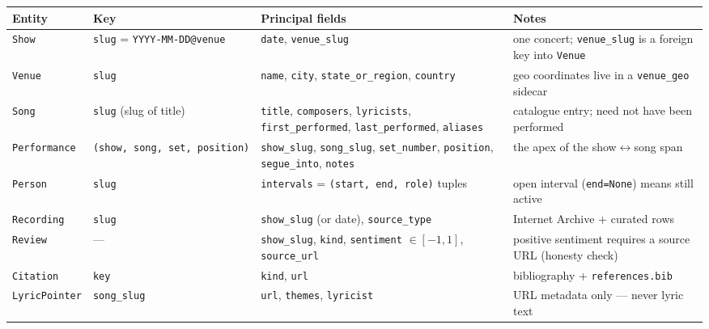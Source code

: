 \documentclass[
]{article}
\newcounter{none} %
\begin{document}
{\def\LTcaptype{none} %
\begin{longtable}[]{@{}
  >{\raggedright\arraybackslash}p{}
  >{\raggedright\arraybackslash}p{}
  >{\raggedright\arraybackslash}p{}
  >{\raggedright\arraybackslash}p{}@{}}
\toprule\noalign{}
\begin{minipage}[b]{\linewidth}\raggedright
Entity
\end{minipage} & \begin{minipage}[b]{\linewidth}\raggedright
Key
\end{minipage} & \begin{minipage}[b]{\linewidth}\raggedright
Principal fields
\end{minipage} & \begin{minipage}[b]{\linewidth}\raggedright
Notes
\end{minipage} \\
\midrule\noalign{}
\endhead
\bottomrule\noalign{}
\endlastfoot
\texttt{Show} & \texttt{slug} = \texttt{YYYY-MM-DD@venue} &
\texttt{date}, \texttt{venue\_slug} & one concert; \texttt{venue\_slug}
is a foreign key into \texttt{Venue} \\
\texttt{Venue} & \texttt{slug} & \texttt{name}, \texttt{city},
\texttt{state\_or\_region}, \texttt{country} & geo coordinates live in a
\texttt{venue\_geo} sidecar \\
\texttt{Song} & \texttt{slug} (slug of title) & \texttt{title},
\texttt{composers}, \texttt{lyricists}, \texttt{first\_performed},
\texttt{last\_performed}, \texttt{aliases} & catalogue entry; need not
have been performed \\
\texttt{Performance} & \texttt{(show,\ song,\ set,\ position)} &
\texttt{show\_slug}, \texttt{song\_slug}, \texttt{set\_number},
\texttt{position}, \texttt{segue\_into}, \texttt{notes} & the apex of
the show\(\leftrightarrow\)song span \\
\texttt{Person} & \texttt{slug} & \texttt{intervals} =
\texttt{(start,\ end,\ role)} tuples & open interval (\texttt{end=None})
means still active \\
\texttt{Recording} & \texttt{slug} & \texttt{show\_slug} (or date),
\texttt{source\_type} & Internet Archive + curated rows \\
\texttt{Review} & --- & \texttt{show\_slug}, \texttt{kind},
\texttt{sentiment} \(\in[-1,1]\), \texttt{source\_url} & positive
sentiment requires a source URL (honesty check) \\
\texttt{Citation} & \texttt{key} & \texttt{kind}, \texttt{url} &
bibliography + \texttt{references.bib} \\
\texttt{LyricPointer} & \texttt{song\_slug} & \texttt{url},
\texttt{themes}, \texttt{lyricist} & URL metadata only --- never lyric
text \\
\end{longtable}
}
\end{document}
